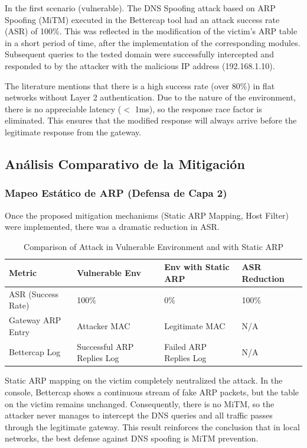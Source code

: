 \documentclass[conference]{IEEEtran}
\begin{document}
In the first scenario (vulnerable). The DNS Spoofing attack based on ARP Spoofing (MiTM) executed in the Bettercap tool had an attack success rate (ASR) of 100\%. This was reflected in the modification of the victim's ARP table in a short period of time, after the implementation of the corresponding modules. Subsequent queries to the tested domain were successfully intercepted and responded to by the attacker with the malicious IP address (192.168.1.10).

The literature mentions that there is a high success rate (over 80\%) in flat networks without Layer 2 authentication. Due to the nature of the environment, there is no appreciable latency ($<$ 1ms), so the response race factor is eliminated. This ensures that the modified response will always arrive before the legitimate response from the gateway.

\subsection{Análisis Comparativo de la Mitigación}
\subsubsection{Mapeo Estático de ARP (Defensa de Capa 2)}

Once the proposed mitigation mechanisms (Static ARP Mapping, Host Filter) were implemented, there was a dramatic reduction in ASR.

\begin{table}[htbp]
\caption{Comparison of Attack in Vulnerable Environment and with Static ARP}
\label{tab:arpcompare}
\begin{center}
\begin{tabular}{@{}p{1.5cm} p{2cm} p{2.5cm} p{1.5cm}@{}} \hline
\textbf{Metric} & \textbf{Vulnerable Env} & \textbf{Env with Static ARP} & \textbf{ASR Reduction} \\ \hline
ASR (Success Rate) & 100\% & 0\% & 100\% \\
Gateway ARP Entry & Attacker MAC & Legitimate MAC & N/A \\
Bettercap Log & Successful ARP Replies Log & Failed ARP Replies Log & N/A \\
\hline
\end{tabular}
\end{center}
\end{table}


Static ARP mapping on the victim completely neutralized the attack. In the console, Bettercap shows a continuous stream of fake ARP packets, but the table on the victim remains unchanged. Consequently, there is no MiTM, so the attacker never manages to intercept the DNS queries and all traffic passes through the legitimate gateway. This result reinforces the conclusion that in local networks, the best defense against DNS spoofing is MiTM prevention.
\end{document}

